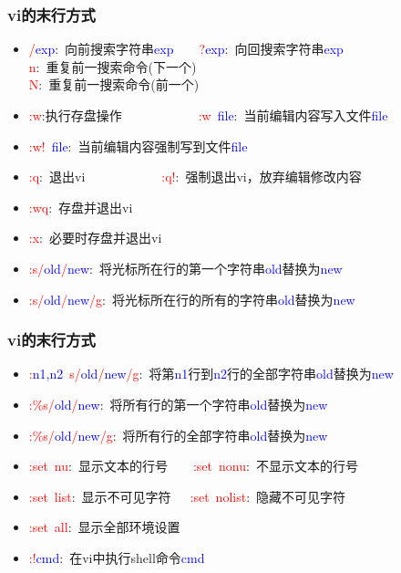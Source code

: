 \frame
{
	\frametitle{\textrm{vi}的末行方式}
	\begin{itemize}
		\item \textcolor{red}{/}\textcolor{blue}{exp}:~向前搜索字符串\textcolor{blue}{exp}~~~~\textcolor{red}{?}\textcolor{blue}{exp}:~向回搜索字符串\textcolor{blue}{exp}\\
		\textcolor{red}{n}:~重复前一搜索命令\textrm{(下一个)}\\
		\textcolor{red}{N}:~重复前一搜索命令\textrm{(前一个)}
		\item \textcolor{red}{:w}:执行存盘操作~~~~~~~~~~~~\textcolor{red}{:w}~\textcolor{blue}{file}:~当前编辑内容写入文件\textcolor{blue}{file}
		\item \textcolor{red}{:w!}~\textcolor{blue}{file}:~当前编辑内容强制写到文件\textcolor{blue}{file}
		\item \textcolor{red}{:q}:~退出\textrm{vi}~~~~~~~~~~~~\textcolor{red}{:q!}:~强制退出\textrm{vi}，放弃编辑修改内容
		\item \textcolor{red}{:wq}:~存盘并退出\textrm{vi}
		\item \textcolor{red}{:x}:~必要时存盘并退出\textrm{vi}
		\item \textcolor{red}{:s/}\textcolor{blue}{old}\textcolor{red}{/}\textcolor{blue}{new}:~将光标所在行的第一个字符串\textcolor{blue}{old}替换为\textcolor{blue}{new}
		\item \textcolor{red}{:s/}\textcolor{blue}{old}\textcolor{red}{/}\textcolor{blue}{new}\textcolor{red}{/g}:~将光标所在行的所有的字符串\textcolor{blue}{old}替换为\textcolor{blue}{new}
	\end{itemize}
}

\frame
{
	\frametitle{\textrm{vi}的末行方式}
	\begin{itemize}
		\item \textcolor{red}{:}\textcolor{blue}{n1,n2}~\textcolor{red}{s/}\textcolor{blue}{old}\textcolor{red}{/}\textcolor{blue}{new}\textcolor{red}{/g}:~将第\textcolor{blue}{n1}行到\textcolor{blue}{n2}行的全部字符串\textcolor{blue}{old}替换为\textcolor{blue}{new}
		\item \textcolor{red}{:\%s/}\textcolor{blue}{old}\textcolor{red}{/}\textcolor{blue}{new}:~将所有行的第一个字符串\textcolor{blue}{old}替换为\textcolor{blue}{new}
		\item \textcolor{red}{:\%s/}\textcolor{blue}{old}\textcolor{red}{/}\textcolor{blue}{new}\textcolor{red}{/g}:~将所有行的全部字符串\textcolor{blue}{old}替换为\textcolor{blue}{new}
		\item \textcolor{red}{:set~nu}:~显示文本的行号~~~~\textcolor{red}{:set~nonu}:~不显示文本的行号
		\item \textcolor{red}{:set~list}:~显示不可见字符~~~\textcolor{red}{:set~nolist}:~隐藏不可见字符
		\item \textcolor{red}{:set~all}:~显示全部环境设置
		\item \textcolor{red}{:!}\textcolor{blue}{cmd}:~在\textrm{vi}中执行\textrm{shell}命令\textcolor{blue}{cmd}
	\end{itemize}
}

